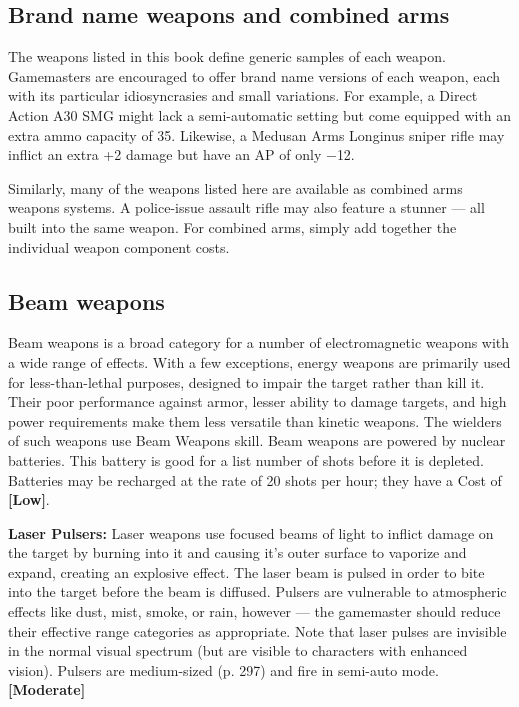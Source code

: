 \subsection{Brand name weapons and combined arms} \label{sec:brand-weapons-combined} 

The weapons listed in this book define generic samples of each weapon. Gamemasters are encouraged to offer brand name versions of each weapon, each with its particular idiosyncrasies and small variations. For example, a Direct Action A30 SMG might lack a semi-automatic setting but come equipped with an extra ammo capacity of 35. Likewise, a Medusan Arms Longinus sniper rifle may inflict an extra +2 damage but have an AP of only $-$12. 

Similarly, many of the weapons listed here are available as combined arms weapons systems. A police-issue assault rifle may also feature a stunner --- all built into the same weapon. For combined arms, simply add together the individual weapon component costs. 



\subsection{Beam weapons} \label{sec:beam-weapons} 

Beam weapons is a broad category for a number of electromagnetic weapons with a wide range of effects. With a few exceptions, energy weapons are primarily used for less-than-lethal purposes, designed to impair the target rather than kill it. Their poor performance against armor, lesser ability to damage targets, and high power requirements make them less versatile than kinetic weapons. The wielders of such weapons use Beam Weapons skill. Beam weapons are powered by nuclear batteries. This battery is good for a list number of shots before it is depleted. Batteries may be recharged at the rate of 20 shots per hour; they have a Cost of \textbf{[Low]}. 

\textbf{Laser Pulsers:} Laser weapons use focused beams of light to inflict damage on the target by burning into it and causing it’s outer surface to vaporize and expand, creating an explosive effect. The laser beam is pulsed in order to bite into the target before the beam is diffused. Pulsers are vulnerable to atmospheric effects like dust, mist, smoke, or rain, however --- the gamemaster should reduce their effective range categories as appropriate. Note that laser pulses are invisible in the normal visual spectrum (but are visible to characters with enhanced vision). Pulsers are medium-sized (p. 297) and fire in semi-auto mode. \textbf{[Moderate]} 

